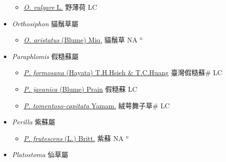 \begin{itemize}
  \begin{itemize}
        \item[] \href{http://www.theplantlist.org/tpl1.1/search?q=Origanum+vulgare}{\textit{O. vulgare} L.}   野薄荷 LC
  \end{itemize}
 \item[] \textit{Orthosiphon} 貓鬚草屬
                    
  \begin{itemize}
        \item[] \href{http://www.theplantlist.org/tpl1.1/search?q=Orthosiphon+aristatus}{\textit{O. aristatus} (Blume) Miq.}   貓鬚草 NA $^n$
  \end{itemize}
 \item[] \textit{Paraphlomis} 假糙蘇屬
                    
  \begin{itemize}
        \item[] \href{http://www.theplantlist.org/tpl1.1/search?q=Paraphlomis+formosana}{\textit{P. formosana} (Hayata) T.H.Hsieh \& T.C.Huang}   臺灣假糙蘇\# LC
        \item[] \href{http://www.theplantlist.org/tpl1.1/search?q=Paraphlomis+javanica}{\textit{P. javanica} (Blume) Prain}   假糙蘇 LC
        \item[] \href{http://www.theplantlist.org/tpl1.1/search?q=Paraphlomis+tomentoso-capitata}{\textit{P. tomentoso-capitata} Yamam.}   絨萼舞子草\# LC
  \end{itemize}
 \item[] \textit{Perilla} 紫蘇屬
                    
  \begin{itemize}
        \item[] \href{http://www.theplantlist.org/tpl1.1/search?q=Perilla+frutescens}{\textit{P. frutescens} (L.) Britt.}   紫蘇 NA $^n$
  \end{itemize}
 \item[] \textit{Platostoma} 仙草屬
                    

\end{itemize}
